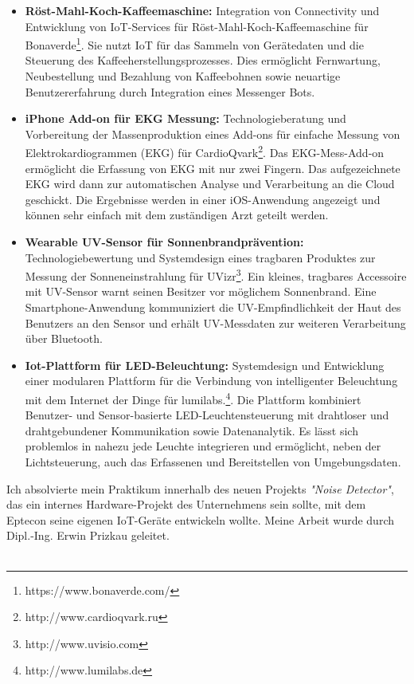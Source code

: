 \begin{itemize}
	\item \textbf{Röst-Mahl-Koch-Kaffeemaschine:} Integration von Connectivity und Entwicklung von IoT-Services für Röst-Mahl-Koch-Kaffeemaschine für Bonaverde\footnote{https://www.bonaverde.com/}. Sie nutzt IoT für das Sammeln von Gerätedaten und die Steuerung des Kaffeeherstellungsprozesses. Dies ermöglicht Fernwartung, Neubestellung und Bezahlung von Kaffeebohnen sowie neuartige Benutzererfahrung durch Integration eines Messenger Bots.
	\item \textbf{iPhone Add-on für EKG Messung:} Technologieberatung und Vorbereitung der Massenproduktion eines Add-ons für einfache Messung von Elektrokardiogrammen (EKG) für CardioQvark\footnote{http://www.cardioqvark.ru}. Das EKG-Mess-Add-on ermöglicht die Erfassung von EKG mit nur zwei Fingern. Das aufgezeichnete EKG wird dann zur automatischen Analyse und Verarbeitung an die Cloud geschickt. Die Ergebnisse werden in einer iOS-Anwendung angezeigt und können sehr einfach mit dem zuständigen Arzt geteilt werden. 
	\item \textbf{Wearable UV-Sensor für Sonnenbrandprävention:} Technologiebewertung und Systemdesign eines tragbaren Produktes zur Messung der Sonneneinstrahlung für UVizr\footnote{http://www.uvisio.com}. Ein kleines, tragbares Accessoire mit UV-Sensor warnt seinen Besitzer vor möglichem Sonnenbrand. Eine Smartphone-Anwendung kommuniziert die UV-Empfindlichkeit der Haut des Benutzers an den Sensor und erhält UV-Messdaten zur weiteren Verarbeitung über Bluetooth. 
	\item \textbf{Iot-Plattform für LED-Beleuchtung:} Systemdesign und Entwicklung einer modularen Plattform für die Verbindung von intelligenter Beleuchtung mit dem Internet der Dinge für lumilabs.\footnote{http://www.lumilabs.de}. Die Plattform kombiniert Benutzer- und Sensor-basierte LED-Leuchtensteuerung mit drahtloser und drahtgebundener Kommunikation sowie Datenanalytik. Es lässt sich problemlos in nahezu jede Leuchte integrieren und ermöglicht, neben der Lichtsteuerung, auch das Erfassenen und Bereitstellen von Umgebungsdaten. 
\end{itemize}  
Ich absolvierte mein Praktikum innerhalb des neuen Projekts \textit{"Noise Detector"}, das ein internes Hardware-Projekt des Unternehmens sein sollte, mit dem Eptecon seine eigenen IoT-Geräte entwickeln wollte. Meine Arbeit wurde durch Dipl.-Ing. Erwin Prizkau geleitet.
\\\\
